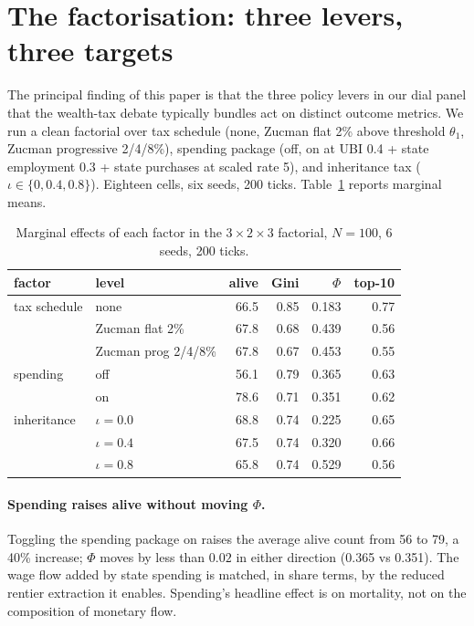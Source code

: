 \documentclass[11pt]{article}
\begin{document}
\section{The factorisation: three levers, three targets}
\label{sec:factorial}

The principal finding of this paper is that the three policy levers
in our dial panel that the wealth-tax debate typically bundles act on
distinct outcome metrics.  We run a clean factorial over tax
schedule (none, Zucman flat 2\% above threshold $\theta_1$, Zucman
progressive 2/4/8\%), spending package (off, on at UBI 0.4 + state
employment 0.3 + state purchases at scaled rate 5), and inheritance
tax ($\iota \in \{0, 0.4, 0.8\}$).  Eighteen cells, six seeds, 200
ticks.  Table~\ref{tab:factorial} reports marginal means.

\begin{table}[t]
\centering
\small
\caption{Marginal effects of each factor in the
$3 \times 2 \times 3$ factorial, $N=100$, 6 seeds, 200 ticks.}
\label{tab:factorial}
\begin{tabular}{llrrrr}
\toprule
factor & level & alive & Gini & $\Phi$ & top-10 \\
\midrule
tax schedule & none                   & 66.5 & 0.85 & 0.183 & 0.77 \\
             & Zucman flat 2\%        & 67.8 & 0.68 & 0.439 & 0.56 \\
             & Zucman prog 2/4/8\%    & 67.8 & 0.67 & 0.453 & 0.55 \\
\midrule
spending     & off                    & 56.1 & 0.79 & 0.365 & 0.63 \\
             & on                     & 78.6 & 0.71 & 0.351 & 0.62 \\
\midrule
inheritance  & $\iota = 0.0$          & 68.8 & 0.74 & 0.225 & 0.65 \\
             & $\iota = 0.4$          & 67.5 & 0.74 & 0.320 & 0.66 \\
             & $\iota = 0.8$          & 65.8 & 0.74 & 0.529 & 0.56 \\
\bottomrule
\end{tabular}
\end{table}

\paragraph{Spending raises alive without moving $\Phi$.}  Toggling the
spending package on raises the average alive count from 56 to 79,
a 40\% increase; $\Phi$ moves by less than $0.02$ in either
direction (0.365 vs 0.351).  The wage flow added by state spending
is matched, in share terms, by the reduced rentier extraction it
enables.  Spending's headline effect is on mortality, not on the
composition of monetary flow.
\end{document}
